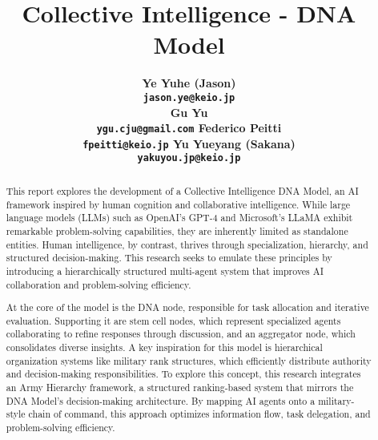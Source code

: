 \title{Collective Intelligence - DNA Model}

\author{
    \bf Ye Yuhe (Jason) \\
    \texttt{jason.ye@keio.jp} \\
    \And
    \bf Gu Yu \\
    \texttt{ygu.cju@gmail.com}
    \And
    \bf Federico Peitti \\
    \texttt{fpeitti@keio.jp}
    \And
    \bf Yu Yueyang (Sakana) \\
    \texttt{yakuyou.jp@keio.jp}
}

\date{}
\maketitle
\onehalfspacing

\begin{abstract}
This report explores the development of a Collective Intelligence DNA Model, an AI framework inspired by human cognition and collaborative intelligence. While large language models (LLMs) such as OpenAI’s GPT-4 and Microsoft’s LLaMA exhibit remarkable problem-solving capabilities, they are inherently limited as standalone entities. Human intelligence, by contrast, thrives through specialization, hierarchy, and structured decision-making. This research seeks to emulate these principles by introducing a hierarchically structured multi-agent system that improves AI collaboration and problem-solving efficiency.

At the core of the model is the DNA node, responsible for task allocation and iterative evaluation. Supporting it are stem cell nodes, which represent specialized agents collaborating to refine responses through discussion, and an aggregator node, which consolidates diverse insights. A key inspiration for this model is hierarchical organization systems like military rank structures, which efficiently distribute authority and decision-making responsibilities. To explore this concept, this research integrates an Army Hierarchy framework, a structured ranking-based system that mirrors the DNA Model’s decision-making architecture. By mapping AI agents onto a military-style chain of command, this approach optimizes information flow, task delegation, and problem-solving efficiency.
\end{abstract}
